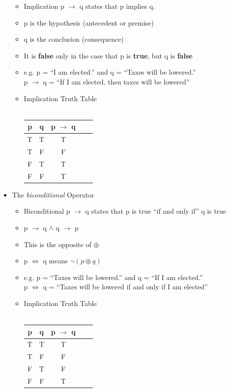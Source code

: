 \documentclass[english, 11pt]{article}
\begin{document}
\begin{addmargin}[2em]{2em}
\begin{itemize}
        \begin{itemize}
          \item Implication p $\to$ q states that p implies q.
          \item p is the hypothesis (antecedent or premise)
          \item q is the conclusion (consequence)
          \item It is \textbf{false} only in the case that p is \textbf{true}, but q is \textbf{false}
          \item e.g. p = ``I am elected.'' and q = ``Taxes will be lowered.''
          \\
          p $\to$ q = ``If I am elected, then taxes will be lowered''
          \item Implication Truth Table
          \\
          \\
          \begin{tabular}{cc|ccc}
            p & q & p  $\to$  q \\
            \hline
            T & T & T  \\
            T & F & F  \\
            F & T & T  \\
            F & F & T
          \end{tabular}

        \end{itemize}

        \item The \textit{biconditional} Operator
          \begin{itemize}
            \item Biconditional p $\to$ q states that p is true ``if and only if'' q is true
            \item p $\to$ q $\wedge$ q $\to$ p
            \item This is the opposite of $\oplus$
            \item p $\iff$ q means \(\neg(p \oplus q)\)
            \item e.g. p = ``Taxes will be lowered.'' and q = ``If I am elected.''
            \\
            p $\iff$ q = ``Taxes will be lowered if and only if I am elected''
            \item Implication Truth Table
            \\
            \\
            \begin{tabular}{cc|ccc}
              p & q & p  $\to$  q \\
              \hline
              T & T & T  \\
              T & F & F  \\
              F & T & F  \\
              F & F & T
            \end{tabular}


\end{itemize}
\end{itemize}
\end{addmargin}
\end{document}
